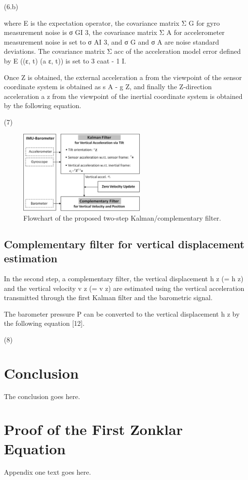 \documentclass[10pt,journal,compsoc]{IEEEtran}
\begin{document}
(6.b)

where E is the expectation operator, the covariance matrix Σ G for gyro
measurement noise is σ GI 3, the covariance matrix Σ A for accelerometer
measurement noise is set to σ AI 3, and σ G and σ A are noise standard
deviations. The covariance matrix Σ acc of the acceleration model error defined
by E ((ε, t) (a ε, t)) is set to 3 caat - 1 I.

Once Z is obtained, the external acceleration a from the viewpoint of the
sensor coordinate system is obtained as s A - g Z, and finally the Z-direction
acceleration a z from the viewpoint of the inertial coordinate system is
obtained by the following equation.

(7)


\begin{figure}[!t]
\centering
\includegraphics[width=2.5in]{fig1}
    \caption{Flowchart of the proposed two-step Kalman/complementary filter.}
\label{fig1}
\end{figure}

\subsection{Complementary filter for vertical displacement estimation}


In the second step, a complementary filter, the vertical displacement h z (= h
z) and the vertical velocity v z (= v z) are estimated using the vertical
acceleration transmitted through the first Kalman filter and the barometric
signal.

The barometer pressure P can be converted to the vertical displacement h z by
the following equation [12].

(8)

\section{Conclusion}
The conclusion goes here.

\appendices
\section{Proof of the First Zonklar Equation}
Appendix one text goes here.
\end{document}
